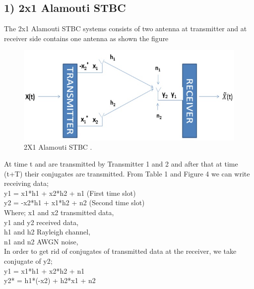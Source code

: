 \documentclass[12pt]{report}
\begin{document}
\subsection*{1) 2x1 Alamouti STBC}
The 2x1 Alamouti STBC systems consists of two antenna
at transmitter and at receiver side contains one antenna as
shown the figure
\begin{figure}[!hbt]
\begin{center}
		\includegraphics[width=\columnwidth]{B}
		\caption{2X1 Alamouti STBC  .}
		\label{fig:tf_plot}
		\end{center}
	\end{figure}
At time t and are transmitted by Transmitter
1 and 2 and after that at time (t+T) their conjugates are
transmitted.
From Table 1 and Figure 4 we can write receiving data;\\
y1 = x1*h1 + x2*h2 + n1  (First time slot) \\
y2 = -x2*h1 + x1*h2 + n2  (Second time slot) \\
Where;
x1 and x2 transmitted data,\\
y1 and y2 received data,\\
h1 and h2 Rayleigh channel,\\
n1 and n2 AWGN noise,\\
In order to get rid of conjugates of transmitted data at the
receiver, we take conjugate of y2;\\
y1 = x1*h1 + x2*h2 + n1\\
y2* = h1*(-x2) + h2*x1 + n2
\end{document}
